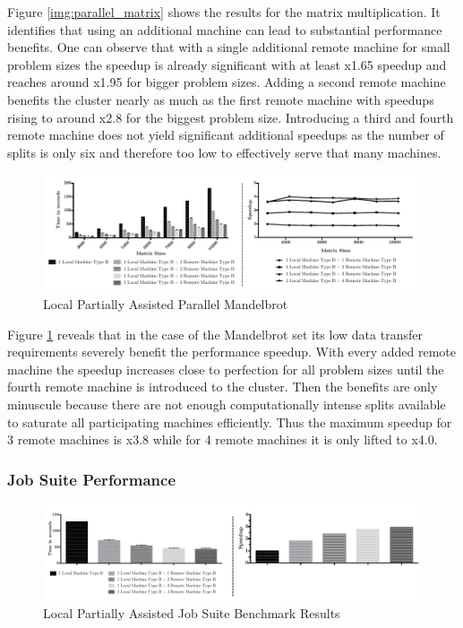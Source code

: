 Figure \ref{img:parallel_matrix} shows the results for the matrix multiplication. It identifies that using an additional machine can lead to substantial performance benefits. One can observe that with a single additional remote machine for small problem sizes the speedup is already significant with at least x1.65 speedup and reaches around x1.95 for bigger problem sizes. Adding a second remote machine benefits the cluster nearly as much as the first remote machine with speedups rising to around x2.8 for the biggest problem size. Introducing a third and fourth remote machine does not yield significant additional speedups as the number of splits is only six and therefore too low to effectively serve that many machines.

\begin{figure}[H]

	\includegraphics[width=1.0\textwidth]{images/local_partially_assisted_mandelbrot.pdf}
	\centering
	\caption{Local Partially Assisted Parallel Mandelbrot}
	\label{img:parallel_mandelbrot}
\end{figure}

Figure \ref{img:parallel_mandelbrot} reveals that in the case of the Mandelbrot set its low data transfer requirements severely benefit the performance speedup. With every added remote machine the speedup increases close to perfection for all problem sizes until the fourth remote machine is introduced to the cluster. Then the benefits are only minuscule because there are not enough computationally intense splits available to saturate all participating machines efficiently. Thus the maximum speedup for 3 remote machines is x3.8 while for 4 remote machines it is only lifted to x4.0.


\subsubsection*{Job Suite Performance}
\label{job_suite_performance}

\begin{figure}[H]

	\includegraphics[width=1.0\textwidth]{images/local_partially_assisted_full_benchmark.pdf}
	\centering
	\caption{Local Partially Assisted Job Suite Benchmark Results}
	\label{img:local_benchmark_results}
\end{figure}

